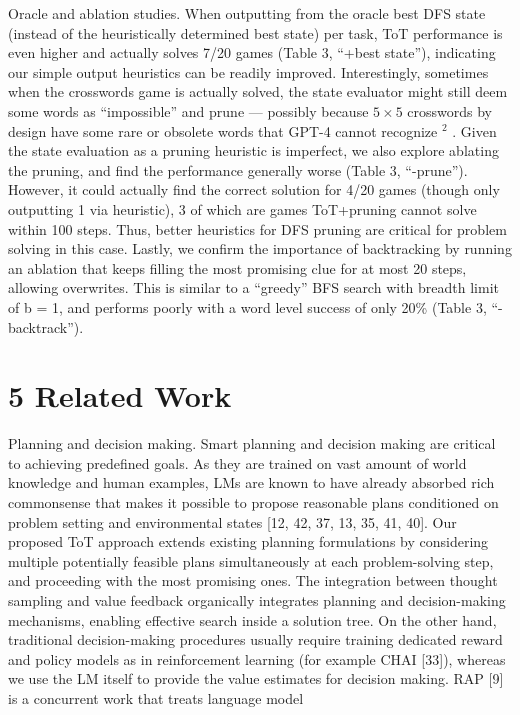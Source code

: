 \documentclass[
]{article}
\begin{document}
Oracle and ablation studies. When outputting from the oracle best DFS
state (instead of the heuristically determined best state) per task, ToT
performance is even higher and actually solves 7/20 games (Table 3,
``+best state''), indicating our simple output heuristics can be readily
improved. Interestingly, sometimes when the crosswords game is actually
solved, the state evaluator might still deem some words as
``impossible'' and prune --- possibly because \(5 \times 5\) crosswords
by design have some rare or obsolete words that GPT-4 cannot recognize
\(^{2}\) . Given the state evaluation as a pruning heuristic is
imperfect, we also explore ablating the pruning, and find the
performance generally worse (Table 3, ``-prune''). However, it could
actually find the correct solution for 4/20 games (though only
outputting 1 via heuristic), 3 of which are games ToT+pruning cannot
solve within 100 steps. Thus, better heuristics for DFS pruning are
critical for problem solving in this case. Lastly, we confirm the
importance of backtracking by running an ablation that keeps filling the
most promising clue for at most 20 steps, allowing overwrites. This is
similar to a ``greedy'' BFS search with breadth limit of b = 1, and
performs poorly with a word level success of only 20\% (Table 3,
``-backtrack'').

\section{5 Related Work}\label{related-work}

Planning and decision making. Smart planning and decision making are
critical to achieving predefined goals. As they are trained on vast
amount of world knowledge and human examples, LMs are known to have
already absorbed rich commonsense that makes it possible to propose
reasonable plans conditioned on problem setting and environmental states
{[}12, 42, 37, 13, 35, 41, 40{]}. Our proposed ToT approach extends
existing planning formulations by considering multiple potentially
feasible plans simultaneously at each problem-solving step, and
proceeding with the most promising ones. The integration between thought
sampling and value feedback organically integrates planning and
decision-making mechanisms, enabling effective search inside a solution
tree. On the other hand, traditional decision-making procedures usually
require training dedicated reward and policy models as in reinforcement
learning (for example CHAI {[}33{]}), whereas we use the LM itself to
provide the value estimates for decision making. RAP {[}9{]} is a
concurrent work that treats language model
\end{document}

